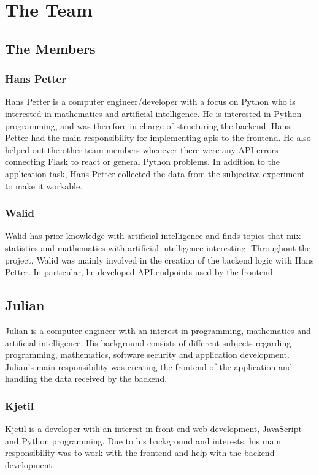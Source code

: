 \section{The Team}

\subsection{The Members}

\subsubsection*{Hans Petter}
Hans Petter is a computer engineer/developer with a focus on Python who is interested in mathematics and artificial intelligence. He is interested in Python programming, and was therefore in charge of structuring the backend. Hans Petter had the main responsibility for implementing \acrshort{api}s to the frontend. He also helped out the other team members whenever there were any API errors connecting Flask to react or general Python problems. In addition to the application task, Hans Petter collected the data from the subjective experiment to make it workable. 

\subsubsection*{Walid}
Walid has prior knowledge with artificial intelligence and finds topics that mix statistics and mathematics with artificial intelligence interesting. Throughout the project, Walid was mainly involved in the creation of the backend logic with Hans Petter. In particular, he developed API endpoints used by the frontend. 

\subsection*{Julian}
Julian is a computer engineer with an interest in programming, mathematics and artificial intelligence. His background consists of different subjects regarding programming, mathematics, software security and application development. Julian's main responsibility was creating the frontend of the application and handling the data received by the backend. 

\subsubsection*{Kjetil}
Kjetil is a developer with an interest in front end web-development, JavaScript and Python programming. Due to his background and interests, his main responsibility was to work with the frontend and help with the backend development. 


